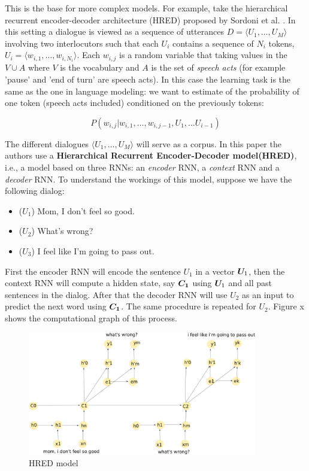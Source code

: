 This is the base for more complex models. For example, take the hierarchical recurrent encoder-decoder architecture (HRED) proposed by Sordoni et al. \cite{Serban:2016a}. In this setting a dialogue is viewed as a sequence of utterances $D=\langle U_1 , \dots, U_M \rangle$ involving two interlocutors such that each $U_i$ contains a sequence of $N_i$ tokens, $U_i = \langle w_{i,1} , \dots, w_{i,N_{i}} \rangle$. Each $w_{i,j}$ is a random variable that taking values in the $V\cup A$ where $V$ is the vocabulary and $A$ is the set of \textit{speech acts} (for example 'pause' and 'end of turn' are  speech acts). In this case the learning task is the same as the one in language modeling: we want to estimate of the probability of one token (speech acts included) conditioned on the previously tokens:

\begin{equation}
P(w_{i,j} | w_{i,1}, \dots , w_{i,j-1}, U_{1}, \dots U_{i-1})
\end{equation}

The different dialogues $\langle U_1 , \dots, U_M \rangle$ will serve as a corpus.
In this paper the authors use a \textbf{Hierarchical Recurrent Encoder-Decoder model(HRED)}, i.e., a model based on three RNNs: an \textit{encoder} RNN, a \textit{context} RNN and a \textit{decoder} RNN.  To understand the workings of this model, suppose we have the following dialog:
\begin{itemize}
\item ($U_1$) Mom, I don't feel so good.\\
\item ($U_2$) What's wrong?\\
\item ($U_3$) I feel like I'm going to pass out.
\end{itemize}

First the encoder RNN will encode the sentence $U_1$ in a vector $\bm{U}_1$, then the context RNN will compute a hidden state, say $\bm{C_1}$ using $\bm{U}_1$ and all past sentences in the dialog. After that the decoder RNN will use $U_2$ as an input to predict the next word using $\bm{C_1}$. The same procedure is repeated for $U_2$. Figure
x shows the computational graph of this process.

\begin{figure}[ht!]
\label{HRED}
\includegraphics[width=10cm]{img/HRED_placeholder.png}
\caption{HRED model}
\end{figure}

